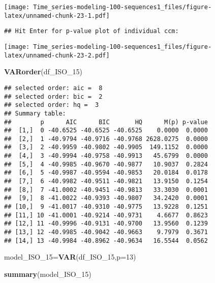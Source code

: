 \documentclass[
]{article}
\newenvironment{Shaded}{\begin{snugshade}}{\end{snugshade}}
\newcommand{\AttributeTok}[1]{\textcolor[rgb]{0.13,0.29,0.53}{#1}}
\newcommand{\DecValTok}[1]{\textcolor[rgb]{0.00,0.00,0.81}{#1}}
\newcommand{\FunctionTok}[1]{\textcolor[rgb]{0.13,0.29,0.53}{\textbf{#1}}}
\newcommand{\NormalTok}[1]{#1}
\newcommand{\OtherTok}[1]{\textcolor[rgb]{0.56,0.35,0.01}{#1}}
\begin{document}
\texttt{[image: Time\_series-modeling-100-sequences1\_files/figure-latex/unnamed-chunk-23-1.pdf]}

\begin{verbatim}
## Hit Enter for p-value plot of individual ccm:
\end{verbatim}

\texttt{[image: Time\_series-modeling-100-sequences1\_files/figure-latex/unnamed-chunk-23-2.pdf]}

\begin{Shaded}
\begin{Highlighting}[]
\FunctionTok{VARorder}\NormalTok{(df\_ISO\_15)}
\end{Highlighting}
\end{Shaded}

\begin{verbatim}
## selected order: aic =  8 
## selected order: bic =  2 
## selected order: hq =  3 
## Summary table:  
##        p      AIC      BIC       HQ      M(p) p-value
##  [1,]  0 -40.6525 -40.6525 -40.6525    0.0000  0.0000
##  [2,]  1 -40.9794 -40.9716 -40.9768 2628.0275  0.0000
##  [3,]  2 -40.9959 -40.9802 -40.9905  149.1152  0.0000
##  [4,]  3 -40.9994 -40.9758 -40.9913   45.6799  0.0000
##  [5,]  4 -40.9985 -40.9670 -40.9877   10.9037  0.2824
##  [6,]  5 -40.9987 -40.9594 -40.9853   20.0184  0.0178
##  [7,]  6 -40.9982 -40.9511 -40.9821   13.9150  0.1254
##  [8,]  7 -41.0002 -40.9451 -40.9813   33.3030  0.0001
##  [9,]  8 -41.0022 -40.9393 -40.9807   34.2420  0.0001
## [10,]  9 -41.0017 -40.9310 -40.9775   13.9228  0.1251
## [11,] 10 -41.0001 -40.9214 -40.9731    4.6677  0.8623
## [12,] 11 -40.9996 -40.9131 -40.9700   13.9560  0.1239
## [13,] 12 -40.9985 -40.9042 -40.9663    9.7979  0.3671
## [14,] 13 -40.9984 -40.8962 -40.9634   16.5544  0.0562
\end{verbatim}

\begin{Shaded}
\begin{Highlighting}[]
\NormalTok{model\_ISO\_15}\OtherTok{=}\FunctionTok{VAR}\NormalTok{(df\_ISO\_15,}\AttributeTok{p=}\DecValTok{13}\NormalTok{)}
\end{Highlighting}
\end{Shaded}

\begin{Shaded}
\begin{Highlighting}[]
\FunctionTok{summary}\NormalTok{(model\_ISO\_15)}
\end{Highlighting}
\end{Shaded}
\end{document}

